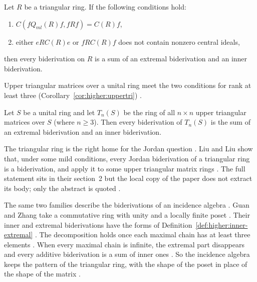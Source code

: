 \begin{theorem}\label{thm:higher:triangularbid}
Let $R$ be a triangular ring. If the following conditions hold:
\begin{enumerate}
\item $C(fQ_{ml}(R)f,fRf)=C(R)f$,
\item either $eRC(R)e$ or $fRC(R)f$ does not contain nonzero central ideals,
\end{enumerate}
then every biderivation on $R$ is a sum of an extremal biderivation and an
inner biderivation.
\end{theorem}

Upper triangular matrices over a unital ring meet the two conditions for rank
at least three (Corollary~\ref{cor:higher:uppertri}) \cite[p.~1956]{Wang2016Bideriv}.

\begin{corollary}\label{cor:higher:uppertri}
Let $S$ be a unital ring and let $T_n(S)$ be the ring of all $n\times n$ upper
triangular matrices over $S$ (where $n\geq 3$). Then every biderivation of
$T_n(S)$ is the sum of an extremal biderivation and an inner biderivation.
\end{corollary}

The triangular ring is the right home for the Jordan question
\cite[p.~1417]{Liu2021JordanBid}. Liu and Liu show that, under some mild
conditions, every Jordan biderivation of a triangular ring is a biderivation,
and apply it to some upper triangular matrix rings
\cite[p.~1417]{Liu2021JordanBid}. The full statement sits in their section~2
but the local copy of the paper does not extract its body; only the abstract
is quoted \cite[p.~1417]{Liu2021JordanBid}.

The same two families describe the biderivations of an incidence algebra
\cite[p.~3]{GuanZhang2024}. Guan and Zhang take a commutative ring with unity
and a locally finite poset \cite[p.~2]{GuanZhang2024}. Their inner and extremal
biderivations have the forms of Definition~\ref{def:higher:inner-extremal}
\cite[p.~3]{GuanZhang2024}. The decomposition holds once each maximal chain has
at least three elements \cite[Theorem~4.10, p.~13]{GuanZhang2024}. When every
maximal chain is infinite, the extremal part disappears and every additive
biderivation is a sum of inner ones \cite[p.~1]{GuanZhang2024}. So the incidence
algebra keeps the pattern of the triangular ring, with the shape of the
poset in place of the shape of the matrix \cite[p.~1]{GuanZhang2024}.

